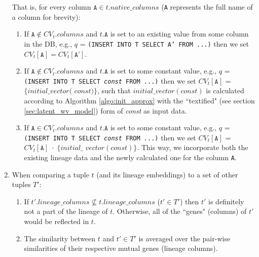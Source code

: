 \begin{enumerate}
    That is, for every column $\texttt{A} \in t.native\_columns$ (\texttt{A} represents the full name of a column for brevity):
    \begin{enumerate}
        \item If $\texttt{A} \notin CV_t.columns$ and $t.\texttt{A}$ is set to an existing value from some column in the DB, e.g., $q$ = \texttt{(INSERT INTO T SELECT A' FROM ...)} then we set $CV_t[\texttt{A}] = CV_t[\texttt{A'}]$.
        \item If $\texttt{A} \notin CV_t.columns$ and $t.\texttt{A}$ is set to some constant value, e.g., $q$ = \texttt{(INSERT INTO T SELECT \textit{const} FROM ...)} then we set $CV_t[\texttt{A}]$ = $\{initial\_vector($ $const)\}$, such that $initial\_vector(const)$ is calculated according to Algorithm \ref{algo:init_approx} with the ``textified" (see section \ref{sec:latent_wv_model}) form of \textit{const} as input data.
        \item If $\texttt{A} \in CV_t.columns$ and $t.\texttt{A}$ is set to some constant value, e.g., $q$ = \texttt{(INSERT INTO T SELECT \textit{const} FROM ...)} then we set $CV_t[\texttt{A}]$ = $CV_t[\texttt{A}]\; \cdot \; \{initial\_$ $vector(const)\}$. This way, we incorporate both the existing lineage data and the newly calculated one for the column \texttt{A}.
    \end{enumerate}
    \item When comparing a tuple $t$ (and its lineage embeddings) to a set of other tuples $T'$:
    \begin{enumerate}
        \item If $t'.lineage\_columns \nsubseteq t.lineage\_columns$ ($t' \in T'$) then $t'$ is definitely not a part of the lineage of $t$. Otherwise, all of the ``genes" (columns) of $t'$ would be reflected in $t$.
        \item The similarity between $t$ and $t' \in T'$ is averaged over the pair-wise similarities of their respective mutual genes (lineage columns).

\end{enumerate}
\end{enumerate}
